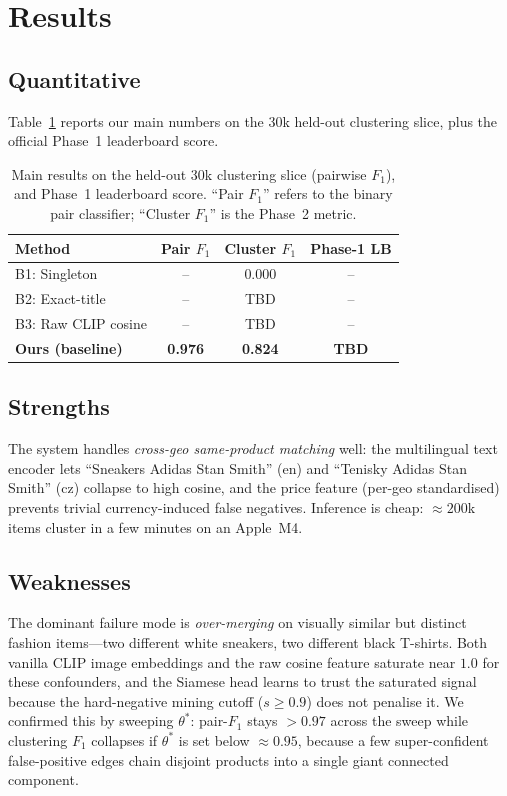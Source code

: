 \documentclass[10pt,conference]{IEEEtran}
\begin{document}
\section{Results}
\label{sec:results}

\subsection{Quantitative}
Table~\ref{tab:main} reports our main numbers on the 30k held-out clustering
slice, plus the official Phase~1 leaderboard score.

\begin{table}[t]
\centering
\caption{Main results on the held-out 30k clustering slice (pairwise $F_1$),
and Phase~1 leaderboard score. ``Pair $F_1$'' refers to the binary pair
classifier; ``Cluster $F_1$'' is the Phase~2 metric.}
\label{tab:main}
\begin{tabular}{lccc}
\toprule
Method & Pair $F_1$ & Cluster $F_1$ & Phase-1 LB \\
\midrule
B1: Singleton            & --      & 0.000  & --     \\
B2: Exact-title          & --      & TBD    & --     \\
B3: Raw CLIP cosine      & --      & TBD    & --     \\
\textbf{Ours (baseline)} & \textbf{0.976} & \textbf{0.824} & \textbf{TBD} \\
\bottomrule
\end{tabular}
\end{table}

\subsection{Strengths}
The system handles \emph{cross-geo same-product matching} well: the
multilingual text encoder lets ``Sneakers Adidas Stan Smith'' (en) and
``Tenisky Adidas Stan Smith'' (cz) collapse to high cosine, and the price
feature (per-geo standardised) prevents trivial currency-induced false
negatives. Inference is cheap: $\approx 200$k items cluster in a few
minutes on an Apple~M4.

\subsection{Weaknesses}
The dominant failure mode is \emph{over-merging} on visually similar but
distinct fashion items---two different white sneakers, two different black
T-shirts. Both vanilla CLIP image embeddings and the raw cosine feature
saturate near $1.0$ for these confounders, and the Siamese head learns to
trust the saturated signal because the hard-negative mining cutoff
($s \ge 0.9$) does not penalise it. We confirmed this by sweeping
$\theta^\ast$: pair-$F_1$ stays $> 0.97$ across the sweep while clustering
$F_1$ collapses if $\theta^\ast$ is set below $\approx 0.95$, because a few
super-confident false-positive edges chain disjoint products into a single
giant connected component.
\end{document}
